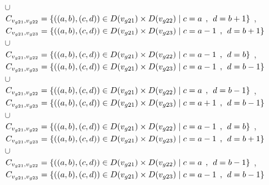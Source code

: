 \\$\cup$
\\$C_{v_{g21},v_{g22}}=\{((a,b),(c,d))\in D(v_{g21}) \times D(v_{g22})\mid c = a  \hspace{1ex} , \hspace{1ex}  d = b + 1 \}$ , 
\\$C_{v_{g21},v_{g23}}=\{((a,b),(c,d))\in D(v_{g21}) \times D(v_{g23})\mid c = a - 1\hspace{1ex} , \hspace{1ex}  d = b + 1 \}$  
\\$\cup$
\\$C_{v_{g21},v_{g22}}=\{((a,b),(c,d))\in D(v_{g21}) \times D(v_{g22})\mid c = a - 1\hspace{1ex} , \hspace{1ex}  d = b   \}$ , 
\\$C_{v_{g21},v_{g23}}=\{((a,b),(c,d))\in D(v_{g21}) \times D(v_{g23})\mid c = a - 1\hspace{1ex} , \hspace{1ex}  d = b - 1 \}$  
\\$\cup$
\\$C_{v_{g21},v_{g22}}=\{((a,b),(c,d))\in D(v_{g21}) \times D(v_{g22})\mid c = a   \hspace{1ex} , \hspace{1ex}  d = b - 1 \}$ , 
\\$C_{v_{g21},v_{g23}}=\{((a,b),(c,d))\in D(v_{g21}) \times D(v_{g23})\mid c = a + 1\hspace{1ex} , \hspace{1ex}  d = b - 1 \}$  
\\$\cup$
\\$C_{v_{g21},v_{g22}}=\{((a,b),(c,d))\in D(v_{g21}) \times D(v_{g22})\mid c = a - 1\hspace{1ex} , \hspace{1ex}  d = b    \}$ , 
\\$C_{v_{g21},v_{g23}}=\{((a,b),(c,d))\in D(v_{g21}) \times D(v_{g23})\mid c = a - 1\hspace{1ex} , \hspace{1ex}  d = b + 1 \}$  
\\$\cup$
\\$C_{v_{g21},v_{g22}}=\{((a,b),(c,d))\in D(v_{g21}) \times D(v_{g22})\mid c = a  \hspace{1ex} , \hspace{1ex}  d = b - 1 \}$ , 
\\$C_{v_{g21},v_{g23}}=\{((a,b),(c,d))\in D(v_{g21}) \times D(v_{g23})\mid c = a - 1\hspace{1ex} , \hspace{1ex}  d = b - 1 \}$  
